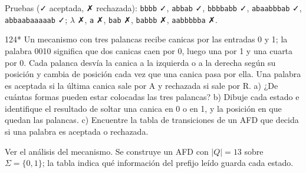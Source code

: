 \documentclass[11pt]{article}
\begin{document}
Pruebas (✓ aceptada, ✗ rechazada): \texttt{bbbb} ✓, \texttt{abbab} ✓, \texttt{bbbbabb} ✓, \texttt{abaabbbab} ✓, \texttt{abbaabaaaaab} ✓; $\lambda$ ✗, \texttt{a} ✗, \texttt{bab} ✗, \texttt{babbb} ✗, \texttt{aabbbbba} ✗.



\begin{ejercicio}{124}{*}
Un mecanismo con tres palancas recibe canicas por las entradas 0 y 1; la palabra 0010 significa que dos canicas caen por 0, luego una por 1 y una cuarta por 0. Cada palanca desvía la canica a la izquierda o a la derecha según su posición y cambia de posición cada vez que una canica pasa por ella. Una palabra es aceptada si la última canica sale por A y rechazada si sale por R. a) ¿De cuántas formas pueden estar colocadas las tres palancas? b) Dibuje cada estado e identifique el resultado de soltar una canica en 0 o en 1, y la posición en que quedan las palancas. c) Encuentre la tabla de transiciones de un AFD que decida si una palabra es aceptada o rechazada.
\end{ejercicio}
\proc Ver el análisis del mecanismo. Se construye un AFD con $|Q| = 13$ sobre $\Sigma = \{0, 1\}$; la tabla indica qué información del prefijo leído guarda cada estado.
\end{document}
